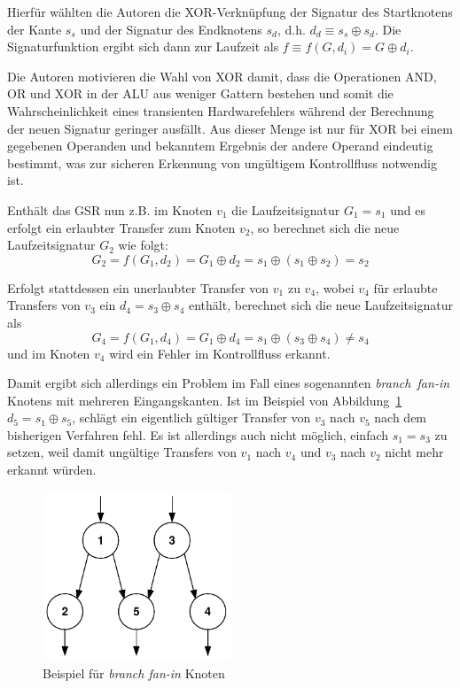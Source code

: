 \documentclass[11pt]{article}
\begin{document}
Hierfür wählten die Autoren die XOR-Verknüpfung der Signatur des Startknotens
der Kante $s_s$ und der Signatur des Endknotens $s_d$, d.h. $d_d \equiv s_s
\oplus s_d$. Die Signaturfunktion ergibt sich dann zur Laufzeit als $f \equiv
f(G, d_i) = G \oplus d_i$.

Die Autoren motivieren die Wahl von XOR damit, dass die Operationen AND, OR und
XOR in der ALU aus weniger Gattern bestehen und somit die Wahrscheinlichkeit
eines transienten Hardwarefehlers während der Berechnung der neuen Signatur
geringer ausfällt. Aus dieser Menge ist nur für XOR bei einem gegebenen
Operanden und bekanntem Ergebnis der andere Operand eindeutig bestimmt, was zur
sicheren Erkennung von ungültigem Kontrollfluss notwendig ist.

Enthält das GSR nun z.B. im Knoten $ v_1 $ die Laufzeitsignatur $ G_1 = s_1 $ und
es erfolgt ein erlaubter Transfer zum Knoten $ v_2 $, so berechnet sich die neue
Laufzeitsignatur $ G_2 $ wie folgt: $$ G_2 = f(G_1, d_2) = G_1 \oplus d_2 = s_1
\oplus (s_1 \oplus s_2) = s_2 $$

Erfolgt stattdessen ein unerlaubter Transfer von $ v_1 $ zu $ v_4 $, wobei
$ v_4 $ für erlaubte Transfers von $ v_3 $ ein $ d_4 = s_3 \oplus s_4
$ enthält, berechnet sich die neue Laufzeitsignatur als $$ G_4 = f(G_1, d_4)
= G_1 \oplus d_4 = s_1 \oplus (s_3 \oplus s_4) \neq s_4 $$ und im Knoten $v_4$
wird ein Fehler im Kontrollfluss erkannt.


Damit ergibt sich allerdings ein Problem im Fall eines sogenannten
\mbox{\emph{branch fan-in}} Knotens mit mehreren Eingangskanten. Ist im
Beispiel von Abbildung~\ref{fig:fanin-node} $ d_5 = s_1 \oplus s_5 $, schlägt
ein eigentlich gültiger Transfer von $ v_3 $ nach $ v_5 $ nach dem bisherigen
Verfahren fehl. Es ist allerdings auch nicht möglich, einfach $ s_1 = s_3 $ zu
setzen, weil damit ungültige Transfers von $ v_1 $ nach $ v_4 $ und $ v_3
$ nach $ v_2 $ nicht mehr erkannt würden.

\begin{figure}
  \centering
  \includegraphics[width=0.5\textwidth]{fanin-node}
  \caption{Beispiel für \emph{branch fan-in} Knoten}
  \label{fig:fanin-node}
\end{figure}
\end{document}
